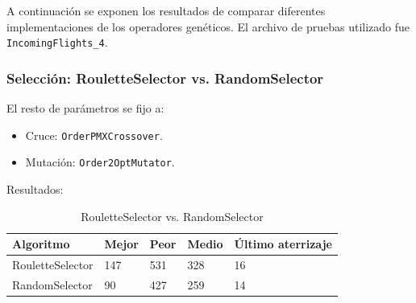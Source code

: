 \documentclass[a4paper,12pt,titlepage]{article}
\begin{document}
A continuación se exponen los resultados de comparar diferentes implementaciones de los operadores genéticos. El archivo de pruebas utilizado fue \lstinline|IncomingFlights_4|.

\subsubsection{Selección: RouletteSelector vs. RandomSelector}

El resto de parámetros se fijo a:

\begin{itemize}[noitemsep]
	\item Cruce: \lstinline|OrderPMXCrossover|.
	\item Mutación: \lstinline|Order2OptMutator|.	
\end{itemize}

Resultados:

\begin{table}[!ht]
\centering
\begin{tabular}{@{}lllll@{}}
\toprule
Algoritmo        & Mejor & Peor & Medio & Último aterrizaje \\ \midrule
RouletteSelector & 147   & 531  & 328   & 16                \\
RandomSelector   & 90    & 427  & 259   & 14                \\ \bottomrule
\end{tabular}
\caption{RouletteSelector vs. RandomSelector}
\end{table}
\end{document}
